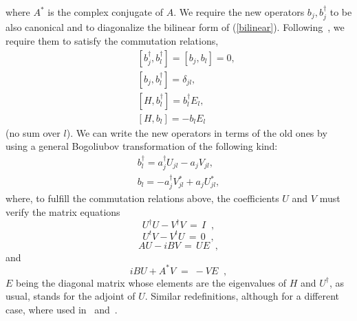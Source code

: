 \documentclass[a4paper,12pt]{article}
\begin{document}
where $A^*$ is the complex conjugate of $A$. We require the new
operators $b_j, b_j^\dagger$ to be also canonical and to diagonalize the
bilinear form of (\ref{bilinear}). Following~\cite{creation}, we
require them to satisfy the commutation relations,
\begin{eqnarray}\label{bconmutacion}
& &[b_j^\dagger,b_l^\dagger]=[b_j,b_l]=0,\nonumber\\ &
&[b_j,b_l^\dagger]=\delta_{jl}, \nonumber\\ &
&[H,b_l^\dagger]=b_l^\dagger E_l,\nonumber\\ & &[H,b_l]=-b_l E_l
\end{eqnarray}
(no sum over $l$). We can write the new operators in terms of the 
old ones by using a general Bogoliubov transformation of the following
kind: 
\begin{eqnarray}\label{cambiobase}
b_l^\dagger=a_j^\dagger U_{jl} - a_j V_{jl},\nonumber \\
b_l=-a_j^\dagger V^*_{jl} + a_j U^*_{jl},
\end{eqnarray}
where, to fulfill the commutation relations above, the coefficients
$U$ and $V$ must verify the matrix equations
\begin{equation}\label{autovalores0}
U^\dagger U - V^\dagger V\,=\,I  \;\;,
\end{equation}
\begin{equation}\label{autovalores1}
U^t V-V^t U\,=\,0 \;\;,
\end{equation}
\begin{equation}\label{autovalores2}
A U-i B V\,=\, U E \;\;,
\end{equation}
and
\begin{equation}\label{autovalores3}
i B U + A^* V \;=\;- V E \;\;,
\end{equation}
$E$ being the diagonal matrix whose elements are the eigenvalues of
$H$ and $U^{\dagger}$, as usual, stands for the adjoint of $U$.  Similar
redefinitions, although for a different case, where used 
in~\cite{creation} and~\cite{bogolubov}.  
\end{document}
